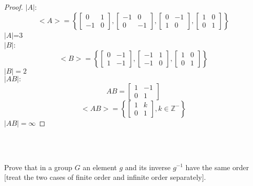 \documentclass[11pt]{article}
\theoremstyle{definition}  %
\newcommand{\Z}{\mathbb{Z}}
\newcommand{\bigline}{\\\noindent\makebox[\linewidth]{\rule{\paperwidth}{0.4pt}}\\}
\begin{document}
  \begin{proof}

    $|A|$:
    \[
      <A>=\left\{
      \begin{bmatrix}
        0&1\\-1&0
      \end{bmatrix},
      \begin{bmatrix}
        -1&0\\0&-1
      \end{bmatrix},
      \begin{bmatrix}
        0&-1\\1&0
      \end{bmatrix},
      \begin{bmatrix}
        1&0\\0&1
      \end{bmatrix}
      \right\}
    \]
    $|A|$=3\\
    $|B|$:
    \[
      <B>=\left\{
      \begin{bmatrix}
        0&-1\\1&-1
      \end{bmatrix},
      \begin{bmatrix}
        -1&1\\-1&0
      \end{bmatrix},
      \begin{bmatrix}
        1&0\\0&1
      \end{bmatrix}
      \right\}
    \]
    $|B|=2$\\
    $|AB|:$\\
    \[
      AB=\begin{bmatrix}
        1&-1\\0&1
      \end{bmatrix}
    \]
    \[
      <AB>=\left\{\begin{bmatrix}
        1&k\\0&1
      \end{bmatrix}, k \in \Z^-\right\}
    \]
    $|AB|=\infty$
  \end{proof}
  \bigline
\begin{tcolorbox}[title=Question 6]
\item Prove that in a group $G$ an element $g$ and its inverse $g^{-1}$ have the same order [treat the two cases of finite order and infinite order separately].
\end{tcolorbox}
\end{document}
